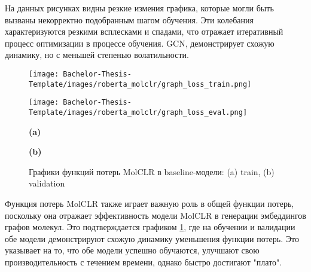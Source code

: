 На данных рисунках видны резкие измения графика, которые могли быть вызваны некорректно подобранным шагом обучения. Эти колебания характеризуются резкими всплесками и спадами, что отражает итеративный процесс оптимизации в процессе обучения. GCN, демонстрирует схожую динамику, но с меньшей степенью волатильности.

\begin{figure}[h]
    \begin{minipage}{0.5\textwidth}
        \centering
        \texttt{[image: Bachelor-Thesis-Template/images/roberta\_molclr/graph\_loss\_train.png]}
    \end{minipage}%
    \begin{minipage}{0.5\textwidth}
        \centering
        \texttt{[image: Bachelor-Thesis-Template/images/roberta\_molclr/graph\_loss\_eval.png]}
    \end{minipage}%

    \newline
    \begin{minipage}{0.5\textwidth}
      \centering
    \textbf{(a)}
    \end{minipage}%
    \begin{minipage}{0.5\textwidth}
    \centering
    \textbf{(b)}
    \end{minipage}%
    
    \caption{\small Графики функций потерь MolCLR в baseline-модели: (a) train, (b) validation}
    \label{fig:molclr_loss_bimodal}
\end{figure}
Функция потерь MolCLR также играет важную роль в общей функции потерь, поскольку она отражает эффективность модели MolCLR в генерации эмбеддингов графов молекул. Это подтверждается графиком \ref{fig:molclr_loss_bimodal}, где на обучении и валидации обе модели демонстрируют схожую динамику уменьшения функции потерь. Это указывает на то, что обе модели успешно обучаются, улучшают свою производительность с течением времени, однако быстро достигают "плато".

